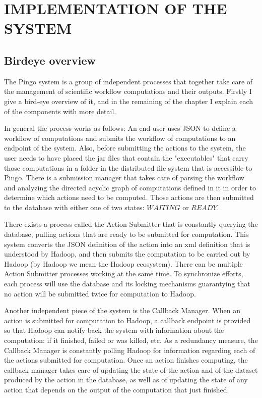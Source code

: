 \chapter{IMPLEMENTATION OF THE SYSTEM}
\label{chap:implementation}
\section{Birdeye overview}
The Pingo system is a group of independent processes that together take care of the management of scientific workflow computations and their outputs.  Firstly I give a bird-eye overview of it, and in the remaining of the chapter I explain each of the components with more detail. 

In general the process works as follows: An end-user uses JSON to define a workflow of computations and submits the workflow of computations to an endpoint of the system. Also, before submitting the actions to the system, the user needs to have placed the jar files that contain the "executables" that carry those computations in a folder in the distributed file system that is accessible to Pingo. There is a submission manager that takes care of parsing the workflow and analyzing the directed acyclic graph of computations defined in it in order to determine which actions need to be computed.  Those actions are then submitted to the database with either one of two states: $WAITING$ or $READY$.

There exists a process called the Action Submitter that is constantly querying the database, pulling actions that are ready to be submitted for computation. This system converts the JSON definition of the action into an xml definition that is understood by Hadoop, and then submits the computation to be carried out by Hadoop (by Hadoop we mean the Hadoop ecosystem). There can be multiple Action Submitter processes working at the same time.  To synchronize efforts, each process will use the database and its locking mechanisms guarantying that no action will be submitted twice for computation to Hadoop.

Another independent piece of the system is the Callback Manager.  When an action is submitted for computation to Hadoop, a callback endpoint is provided so that Hadoop can notify back the system with information about the computation: if it finished, failed or was killed, etc.  As a redundancy measure, the Callback Manager is constantly polling Hadoop for information regarding each of the actions submitted for computation.  Once an action finishes computing, the callback manager takes care of updating the state of the action and of the dataset produced by the action in the database, as well as of updating the state of any action that depends on the output of the computation that just finished.

